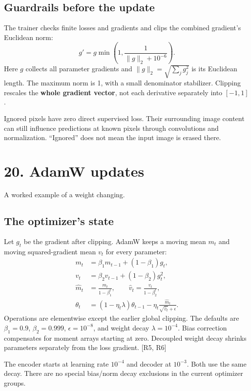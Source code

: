 \documentclass[11pt,letterpaper]{article}
\newcommand{\note}[1]{\par\vspace{3pt}\begingroup\setlength{\fboxsep}{8pt}%
 \colorbox{pale}{\parbox{\dimexpr\linewidth-2\fboxsep\relax}{#1}}\endgroup\par\vspace{3pt}}
\newcommand{\guidepage}[2]{\clearpage\pdfbookmark[0]{#1}{guide-\thepage}\section*{#1}{\sffamily\color{muted}#2}\par\vspace{5pt}}
\begin{document}
\subsection*{Guardrails before the update}
The trainer checks finite losses and gradients and clips the combined gradient's Euclidean norm:
\[
g'=g\min\!\left(1,\frac{1}{\lVert g\rVert_2+10^{-6}}\right).
\]
Here $g$ collects all parameter gradients and $\lVert g\rVert_2=\sqrt{\sum_j g_j^2}$ is its Euclidean length. The maximum norm is 1, with a small denominator stabilizer. Clipping rescales the \textbf{whole gradient vector}, not each derivative separately into $[-1,1]$.

\note{Ignored pixels have zero direct supervised loss. Their surrounding image content can still influence predictions at known pixels through convolutions and normalization. ``Ignored'' does not mean the input image is erased there.}

\guidepage{20. AdamW updates}{A worked example of a weight changing.}
\subsection*{The optimizer's state}
Let $g_t$ be the gradient after clipping. AdamW keeps a moving mean $m_t$ and moving squared-gradient mean $v_t$ for every parameter:
\begin{align*}
m_t&=\beta_1m_{t-1}+(1-\beta_1)g_t,\\
v_t&=\beta_2v_{t-1}+(1-\beta_2)g_t^2,\\
\widehat m_t&=\frac{m_t}{1-\beta_1^t},\qquad
\widehat v_t=\frac{v_t}{1-\beta_2^t},\\
\theta_t&=(1-\eta_t\lambda)\theta_{t-1}
-\eta_t\frac{\widehat m_t}{\sqrt{\widehat v_t}+\epsilon}.
\end{align*}
Operations are elementwise except the earlier global clipping. The defaults are $\beta_1=0.9$, $\beta_2=0.999$, $\epsilon=10^{-8}$, and weight decay $\lambda=10^{-4}$. Bias correction compensates for moment arrays starting at zero. Decoupled weight decay shrinks parameters separately from the loss gradient. [R5, R6]

The encoder starts at learning rate $10^{-4}$ and decoder at $10^{-3}$. Both use the same decay. There are no special bias/norm decay exclusions in the current optimizer groups.
\end{document}
